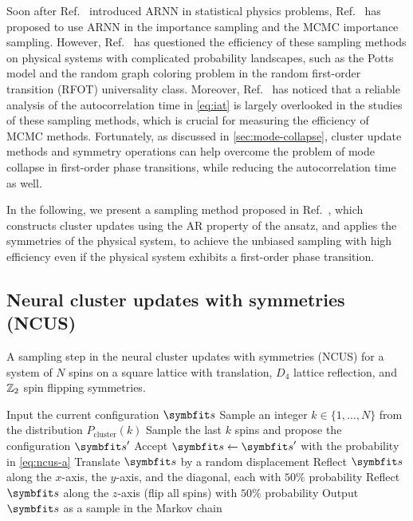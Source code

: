 Soon after Ref.~\cite{wu2019solving} introduced ARNN in statistical physics problems, Ref.~\cite{nicoli2020asymptotically} has proposed to use ARNN in the importance sampling and the MCMC importance sampling. However, Ref.~\cite{ciarella2023machine} has questioned the efficiency of these sampling methods on physical systems with complicated probability landscapes, such as the Potts model and the random graph coloring problem in the random first-order transition (RFOT) universality class. Moreover, Ref.~\cite{bialas2023analysis} has noticed that a reliable analysis of the autocorrelation time in \cref{eq:iat} is largely overlooked in the studies of these sampling methods, which is crucial for measuring the efficiency of MCMC methods. Fortunately, as discussed in \cref{sec:mode-collapse}, cluster update methods and symmetry operations can help overcome the problem of mode collapse in first-order phase transitions, while reducing the autocorrelation time as well.

In the following, we present a sampling method proposed in Ref.~\cite{wu2021unbiased}, which constructs cluster updates using the AR property of the ansatz, and applies the symmetries of the physical system, to achieve the unbiased sampling with high efficiency even if the physical system exhibits a first-order phase transition.

\subsection{Neural cluster updates with symmetries (NCUS)}
\label{sec:ncus}

\begin{algorithm}[H]
\caption[Neural cluster updates with symmetries (NCUS)]{
A sampling step in the neural cluster updates with symmetries (NCUS) for a system of $N$ spins on a square lattice with translation, $D_4$ lattice reflection, and $\mathbb{Z}_2$ spin flipping symmetries.
}
\label{alg:ncus}
\begin{algorithmic}[1]
\STATE Input the current configuration $\vs$
\STATE Sample an integer $k \in \{1, \ldots, N\}$ from the distribution $P_\text{cluster}(k)$
\STATE Sample the last $k$ spins and propose the configuration $\vs'$
\STATE Accept $\vs \gets \vs'$ with the probability in \cref{eq:ncus-a}
\STATE Translate $\vs$ by a random displacement
\STATE Reflect $\vs$ along the $x$-axis, the $y$-axis, and the diagonal, each with $50\%$ probability
\STATE Reflect $\vs$ along the $z$-axis (flip all spins) with $50\%$ probability
\STATE Output $\vs$ as a sample in the Markov chain
\end{algorithmic}
\end{algorithm}

